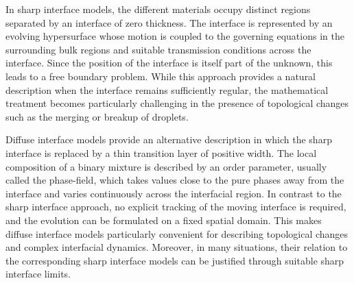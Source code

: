 \documentclass[11pt,reqno]{amsart}
\theoremstyle{remark}
\numberwithin{equation}{section}
\begin{document}
In sharp interface models, the different materials occupy distinct regions separated by an interface of zero thickness. The interface is represented by an evolving hypersurface whose motion is coupled to the governing equations in the surrounding bulk regions and suitable transmission conditions across the interface. Since the position of the interface is itself part of the unknown, this leads to a free boundary problem. While this approach provides a natural description when the interface remains sufficiently regular, the mathematical treatment becomes particularly challenging in the presence of topological changes such as the merging or breakup of droplets.

Diffuse interface models provide an alternative description in which the sharp interface is replaced by a thin transition layer of positive width. The local composition of a binary mixture is described by an order parameter, usually called the phase-field, which takes values close to the pure phases away from the interface and varies continuously across the interfacial region. In contrast to the sharp interface approach, no explicit tracking of the moving interface is required, and the evolution can be formulated on a fixed spatial domain. This makes diffuse interface models particularly convenient for describing topological changes and complex interfacial dynamics. Moreover, in many situations, their relation to the corresponding sharp interface models can be justified through suitable sharp interface limits.
\end{document}

